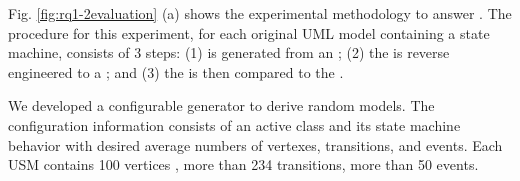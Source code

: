 Fig. \ref{fig:rq1-2evaluation} (a) shows the experimental methodology to answer . 
The procedure for this experiment, for each original UML model containing a state machine, consists of 3 steps: (1)  is generated from an ; (2) the  is reverse engineered to a ; and (3) the  is then compared to the .

We developed a configurable generator to derive random models. 
The configuration information consists of an active class and its state machine behavior with desired average numbers of vertexes, transitions, and events. 
Each USM contains 100 vertices , more than 234 transitions, more than 50 events. 

